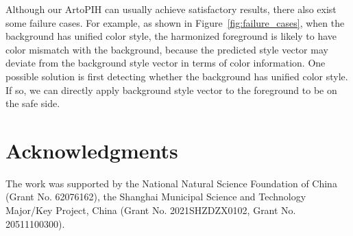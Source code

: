 \documentclass[letterpaper]{article} %
\begin{document}
Although our ArtoPIH can usually achieve satisfactory results, there also exist some failure cases. For example, as shown in Figure~\ref{fig:failure_cases}, when the background has unified color style, the harmonized foreground is likely to have color mismatch with the background, because the predicted style vector may deviate from the background style vector in terms of color information. One possible solution is first detecting whether the background has unified color style. If so, we can directly apply background style vector to the foreground to be on the safe side. 










\section*{Acknowledgments}
The work was supported by the National Natural Science Foundation of China (Grant No. 62076162), the Shanghai Municipal Science and Technology Major/Key Project, China (Grant No. 2021SHZDZX0102, Grant No. 20511100300).  



\end{document}
